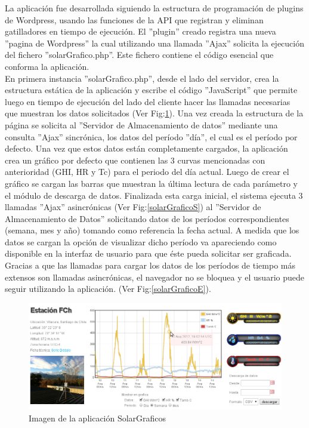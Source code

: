 La aplicación fue desarrollada siguiendo la estructura de programación de plugins de Wordpress\cite{aplicacion:wplugins}, usando las funciones de la API que registran y eliminan gatilladores en tiempo de ejecución. El ''plugin'' creado registra una nueva ''pagina de Wordpress'' la cual utilizando una llamada ''Ajax'' solicita la ejecución del fichero ''solarGrafico.php''. Este fichero contiene el código esencial que conforma la aplicación.\\

En primera instancia ''solarGrafico.php'', desde el lado del servidor, crea la estructura estática de la aplicación y escribe el código ''JavaScript'' que permite luego en tiempo de ejecución del lado del cliente hacer las llamadas necesarias que muestran los datos solicitados (Ver Fig:\ref{solarGraficoFoto1}). Una vez creada la estructura de la página se solicita al ''Servidor de Almacenamiento de datos'' mediante una consulta ''Ajax'' sincrónica, los datos del período ''día'', el cual es el período por defecto. Una vez que estos datos están completamente cargados, la aplicación crea un gráfico por defecto que contienen las 3 curvas mencionadas con anterioridad (GHI, HR y Tc) para el periodo del día actual. Luego de crear el gráfico se cargan las barras que muestran la última lectura de cada parámetro y el módulo de descarga de datos. Finalizada esta carga inicial, el sistema ejecuta 3 llamadas ''Ajax'' asincrónicas (Ver Fig:\ref{solarGraficoS}) al ''Servidor de Almacenamiento de Datos'' solicitando datos de los períodos correspondientes (semana, mes y año) tomando como referencia la fecha actual. A medida que los datos se cargan la opción de visualizar dicho período va apareciendo como disponible en la interfaz de usuario para que éste pueda solicitar ser graficada. Gracias a que las llamadas para cargar los datos de los períodos de tiempo más extensos son llamadas asincrónicas, el navegador no se bloquea y el usuario puede seguir utilizando la aplicación. (Ver Fig:\ref{solarGraficoE}).

\begin{figure}[h!]
        \centering
        \includegraphics[scale=0.45]{images/solarGrafico}
        \caption{Imagen de la aplicación SolarGraficos}
        \label{solarGraficoFoto1}
\end{figure}

